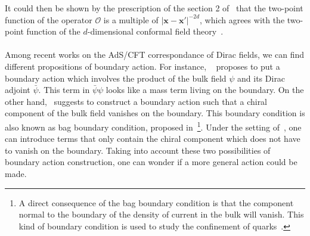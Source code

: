 It could then be shown by the prescription of the section 2 of~\cite{Skenderis2002} that the two-point function of the operator $\mathcal{O}$ is a multiple of $|\mathbf{x} - \mathbf{x}'|^{-2d}$, which agrees with the two-point function of the $d$-dimensional conformal field theory~\cite{Qualls2015}. \\\\
%
Among recent works on the AdS/CFT correspondance of Dirac fields, we can find different propositions of boundary action.
For instance, 
~\cite{Henningson1998} proposes to put a boundary action which involves the product of the bulk field $\psi$ and its Dirac adjoint $\bar{\psi}$. 
This term in $\bar{\psi}\psi$ looks like a mass term living on the boundary.
On the other hand,~\cite{Contino2005} suggests to construct a boundary action such that a chiral component of the bulk field vanishes on the boundary.
This boundary condition is also known as bag boundary condition, proposed in~\cite{Chodos1974}\footnote{
A direct consequence of the bag boundary condition is that the component normal to the boundary of the density of current in the bulk will vanish. 
This kind of boundary condition is used to study the confinement of quarks~\cite{Hasenfratz1978}.
}.
Under the setting of~\cite{Contino2005}, one can introduce terms that only contain the chiral component which does not have to vanish on the boundary.
Taking into account these two possibilities of boundary action construction, 
one can wonder if a more general action could be made. 
%
%
%












